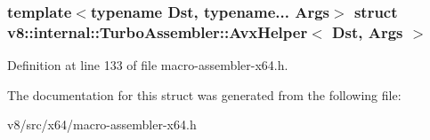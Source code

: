 \subsubsection*{template$<$typename Dst, typename... Args$>$\newline
struct v8\+::internal\+::\+Turbo\+Assembler\+::\+Avx\+Helper$<$ Dst, Args $>$}



Definition at line 133 of file macro-\/assembler-\/x64.\+h.



The documentation for this struct was generated from the following file\+:\begin{DoxyCompactItemize}
\item 
v8/src/x64/macro-\/assembler-\/x64.\+h\end{DoxyCompactItemize}

